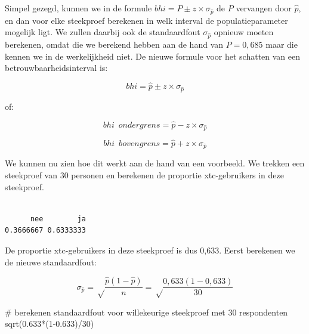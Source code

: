 \documentclass[
  letterpaper,
  DIV=11,
  numbers=noendperiod]{scrreprt}
\newenvironment{Shaded}{\begin{snugshade}}{\end{snugshade}}
\newcommand{\AttributeTok}[1]{\textcolor[rgb]{0.40,0.45,0.13}{#1}}
\newcommand{\CommentTok}[1]{\textcolor[rgb]{0.37,0.37,0.37}{#1}}
\newcommand{\DecValTok}[1]{\textcolor[rgb]{0.68,0.00,0.00}{#1}}
\newcommand{\FloatTok}[1]{\textcolor[rgb]{0.68,0.00,0.00}{#1}}
\newcommand{\FunctionTok}[1]{\textcolor[rgb]{0.28,0.35,0.67}{#1}}
\newcommand{\NormalTok}[1]{\textcolor[rgb]{0.00,0.23,0.31}{#1}}
\newcommand{\OtherTok}[1]{\textcolor[rgb]{0.00,0.23,0.31}{#1}}
\newcommand{\SpecialCharTok}[1]{\textcolor[rgb]{0.37,0.37,0.37}{#1}}
\begin{document}
Simpel gezegd, kunnen we in de formule
\(bhi = P \pm z\times\sigma_{\hat{p}}\) de \(P\) vervangen door
\(\hat{p}\), en dan voor elke steekproef berekenen in welk interval de
populatieparameter mogelijk ligt. We zullen daarbij ook de standaardfout
\(\sigma_{\hat{p}}\) opnieuw moeten berekenen, omdat die we berekend
hebben aan de hand van \(P=0,685\) maar die kennen we in de
werkelijkheid niet. De nieuwe formule voor het schatten van een
betrouwbaarheidsinterval is:

\[ bhi = \hat{p} \pm z\times\sigma_{\hat{p}}  \]

of:

\[bhi \enspace ondergrens = \hat{p} - z\times\sigma_{\hat{p}}\]

\[bhi \enspace bovengrens = \hat{p} + z\times\sigma_{\hat{p}}\]

We kunnen nu zien hoe dit werkt aan de hand van een voorbeeld. We
trekken een steekproef van 30 personen en berekenen de proportie
xtc-gebruikers in deze steekproef.

\begin{Shaded}
\end{Shaded}

\begin{verbatim}

      nee        ja 
0.3666667 0.6333333 
\end{verbatim}

De proportie xtc-gebruikers in deze steekproef is dus 0,633. Eerst
berekenen we de nieuwe standaardfout:

\[\sigma_{\hat{p}}=\sqrt\frac{\hat{p}(1-\hat{p})}{n}=\sqrt\frac{0,633(1-0,633)}{30}\]

\begin{Shaded}
\begin{Highlighting}[]
\CommentTok{\# berekenen standaardfout voor willekeurige steekproef met 30 respondenten}
\FunctionTok{sqrt}\NormalTok{(}\FloatTok{0.633}\SpecialCharTok{*}\NormalTok{(}\DecValTok{1}\FloatTok{{-}0.633}\NormalTok{)}\SpecialCharTok{/}\DecValTok{30}\NormalTok{)}
\end{Highlighting}
\end{Shaded}
\end{document}
